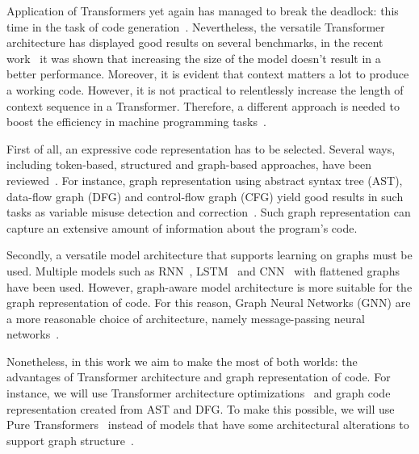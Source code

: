 Application of Transformers yet again has managed to break the deadlock: this time in the task of code generation~\cite{hendrycks_measuring_2021,chen_evaluating_2021,li_competition-level_nodate,nijkamp_conversational_2022}.
Nevertheless, the versatile Transformer architecture has displayed good results on several benchmarks,
in the recent work~\cite{xu_systematic_2022} it was shown that increasing the size of the model doesn't result in a better performance.
Moreover, it is evident that context matters a lot to produce a working code.
However, it is not practical to relentlessly increase the length of context sequence in a Transformer.
Therefore, a different approach is needed to boost the efficiency in machine programming tasks~\cite{arutyunov_big_2022}.

First of all, an expressive code representation has to be selected.
Several ways, including token-based, structured and graph-based approaches, have been reviewed~\cite{sm_avdoshin_code_2022}.
For instance, graph representation using abstract syntax tree (AST), data-flow graph (DFG) and control-flow graph (CFG)
yield good results in such tasks as variable misuse detection and correction~\cite{allamanis_learning_2017}.
Such graph representation can capture an extensive amount of information about the program's code.

Secondly, a versatile model architecture that supports learning on graphs must be used.
Multiple models such as RNN~\cite{white_deep_2016}, LSTM~\cite{wei_supervised_2017} and CNN~\cite{mou_convolutional_2016} with flattened graphs have been used.
However, graph-aware model architecture is more suitable for the graph representation of code.
For this reason, Graph Neural Networks (GNN) are a more reasonable choice of architecture,
namely message-passing neural networks~\cite{allamanis_learning_2017}.

Nonetheless, in this work we aim to make the most of both worlds: the advantages of Transformer architecture and graph representation of code.
For instance, we will use Transformer architecture optimizations~\cite{choromanski_rethinking_2020} and graph code representation created from AST and DFG.
To make this possible, we will use Pure Transformers~\cite{kim_pure_2022} instead of models that have some architectural alterations to support graph structure~\cite{kreuzer_rethinking_2021,dwivedi_generalization_2021,ying_transformers_2021}.